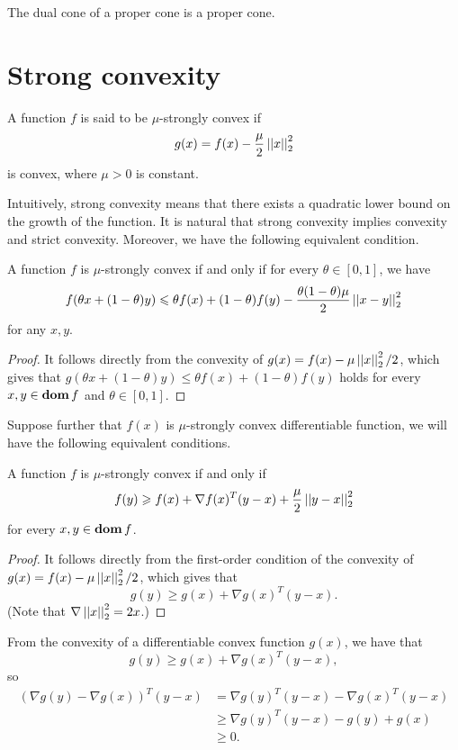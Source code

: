 \documentclass[12pt]{article}
\begin{document}
\begin{corollary}
    The dual cone of a proper cone is a proper cone.
\end{corollary}

\section{Strong convexity}

\begin{definition}
    A function \(f\) is said to be \(\mu\)\textnormal{-strongly convex} if
    \[g(x)=f(x)-\frac{\mu}2\left|\left|x\right|\right|_2^2\]
    is convex, where \(\mu>0\) is constant.
\end{definition}

Intuitively, strong convexity means that there exists a quadratic lower bound on the growth of the function. It is natural that strong convexity implies convexity and strict convexity. Moreover, we have the following equivalent condition.

\begin{proposition}
    A function \(f\) is \(\mu\)-strongly convex if and only if for every \(\theta\in[0,1]\), we have
    \[f(\theta x+(1-\theta)y)\leqslant\theta f(x)+(1-\theta)f(y)-\frac{\theta(1-\theta)\mu}2\left|\left|x-y\right|\right|_2^2\]
    for any \(x,y\).
\end{proposition}
\begin{proof}
    It follows directly from the convexity of \(g(x)=f(x)-\mu\left|\left|x\right|\right|_2^2/2\), which gives that \(g(\theta x+(1-\theta)y)\leqslant\theta f(x)+(1-\theta)f(y)\) holds for every \(x,y\in\operatorname{\mathbf{dom}} f\) and \(\theta\in[0,1]\).
\end{proof}

Suppose further that \(f(x)\) is \(\mu\)-strongly convex differentiable function, we will have the following equivalent conditions.

\begin{proposition}
    A function \(f\) is \(\mu\)-strongly convex if and only if
    \[f(y)\geqslant f(x)+\nabla f(x)^T(y-x)+\frac{\mu}2\left|\left|y-x\right|\right|_2^2\]
    for every \(x,y\in\operatorname{\mathbf{dom}} f\).
\end{proposition}
\begin{proof}
    It follows directly from the first-order condition of the convexity of \(g(x)=f(x)-\mu\left|\left|x\right|\right|_2^2/2\), which gives that
    \[g(y)\geqslant g(x)+\nabla g(x)^T(y-x).\]
    (Note that \(\nabla\left|\left|x\right|\right|_2^2=2x\).)
\end{proof}

\begin{remark}\label{rem1.4}
    From the convexity of a differentiable convex function \(g(x)\), we have that
    \[g(y)\geqslant g(x)+\nabla g(x)^T(y-x),\]
    so
    \[\begin{aligned}
        \left(\nabla g(y)-\nabla g(x)\right)^T(y-x)
        &= \nabla g(y)^T(y-x)-\nabla g(x)^T(y-x)\\
        &\geqslant \nabla g(y)^T(y-x)-g(y)+g(x)\\
        &\geqslant 0.
    \end{aligned}\]
\end{remark}
\end{document}
